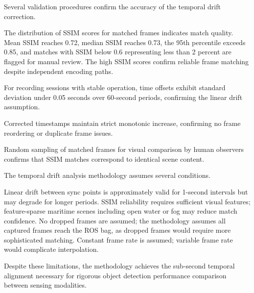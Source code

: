 \documentclass{erauthesis}
\begin{document}

Several validation procedures confirm the accuracy of the temporal drift correction.


The distribution of SSIM scores for matched frames indicates match quality.
Mean SSIM reaches 0.72, median SSIM reaches 0.73, the 95th percentile exceeds 0.85, and matches with SSIM below 0.6 representing less than 2 percent are flagged for manual review.
The high SSIM scores confirm reliable frame matching despite independent encoding paths.


For recording sessions with stable operation, time offsets exhibit standard deviation under 0.05 seconds over 60-second periods, confirming the linear drift assumption.


Corrected timestamps maintain strict monotonic increase, confirming no frame reordering or duplicate frame issues.


Random sampling of matched frames for visual comparison by human observers confirms that SSIM matches correspond to identical scene content.


The temporal drift analysis methodology assumes several conditions.

Linear drift between sync points is approximately valid for 1-second intervals but may degrade for longer periods.
SSIM reliability requires sufficient visual features; feature-sparse maritime scenes including open water or fog may reduce match confidence.
No dropped frames are assumed; the methodology assumes all captured frames reach the ROS bag, as dropped frames would require more sophisticated matching.
Constant frame rate is assumed; variable frame rate would complicate interpolation.

Despite these limitations, the methodology achieves the sub-second temporal alignment necessary for rigorous object detection performance comparison between sensing modalities.




\end{document}
